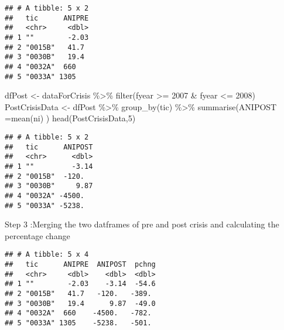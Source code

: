 \documentclass[
]{article}
\newenvironment{Shaded}{\begin{snugshade}}{\end{snugshade}}
\newcommand{\AttributeTok}[1]{\textcolor[rgb]{0.77,0.63,0.00}{#1}}
\newcommand{\DecValTok}[1]{\textcolor[rgb]{0.00,0.00,0.81}{#1}}
\newcommand{\FunctionTok}[1]{\textcolor[rgb]{0.00,0.00,0.00}{#1}}
\newcommand{\NormalTok}[1]{#1}
\newcommand{\OtherTok}[1]{\textcolor[rgb]{0.56,0.35,0.01}{#1}}
\newcommand{\SpecialCharTok}[1]{\textcolor[rgb]{0.00,0.00,0.00}{#1}}
\newcommand{\StringTok}[1]{\textcolor[rgb]{0.31,0.60,0.02}{#1}}
\begin{document}
\begin{verbatim}
## # A tibble: 5 x 2
##   tic      ANIPRE
##   <chr>     <dbl>
## 1 ""        -2.03
## 2 "0015B"   41.7 
## 3 "0030B"   19.4 
## 4 "0032A"  660   
## 5 "0033A" 1305
\end{verbatim}

\begin{Shaded}
\begin{Highlighting}[]
\NormalTok{dfPost  }\OtherTok{\textless{}{-}}\NormalTok{ dataForCrisis }\SpecialCharTok{\%\textgreater{}\%} \FunctionTok{filter}\NormalTok{(fyear }\SpecialCharTok{\textgreater{}=} \DecValTok{2007} \SpecialCharTok{\&}\NormalTok{ fyear }\SpecialCharTok{\textless{}=} \DecValTok{2008}\NormalTok{)}
\NormalTok{PostCrisisData  }\OtherTok{\textless{}{-}}\NormalTok{ dfPost }\SpecialCharTok{\%\textgreater{}\%} \FunctionTok{group\_by}\NormalTok{(tic) }\SpecialCharTok{\%\textgreater{}\%} \FunctionTok{summarise}\NormalTok{(}\AttributeTok{ANIPOST =}\FunctionTok{mean}\NormalTok{(ni) )}
\FunctionTok{head}\NormalTok{(PostCrisisData,}\DecValTok{5}\NormalTok{)}
\end{Highlighting}
\end{Shaded}

\begin{verbatim}
## # A tibble: 5 x 2
##   tic      ANIPOST
##   <chr>      <dbl>
## 1 ""         -3.14
## 2 "0015B"  -120.  
## 3 "0030B"     9.87
## 4 "0032A" -4500.  
## 5 "0033A" -5238.
\end{verbatim}

Step 3 :Merging the two datframes of pre and post crisis and calculating
the percentage change

\begin{Shaded}
\end{Shaded}

\begin{verbatim}
## # A tibble: 5 x 4
##   tic      ANIPRE  ANIPOST  pchng
##   <chr>     <dbl>    <dbl>  <dbl>
## 1 ""        -2.03    -3.14  -54.6
## 2 "0015B"   41.7   -120.   -389. 
## 3 "0030B"   19.4      9.87  -49.0
## 4 "0032A"  660    -4500.   -782. 
## 5 "0033A" 1305    -5238.   -501.
\end{verbatim}
\end{document}
